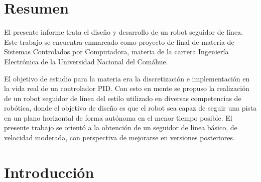 \documentclass[10pt,conference,a4paper,onecolumn]{article}%
\begin{document}
%
%
%

\section{Resumen}
El presente informe trata el diseño y desarrollo de un robot seguidor de línea. Este trabajo se encuentra enmarcado como proyecto de final de materia de Sistemas Controlados por Computadora, materia de la carrera Ingeniería Electrónica de la Universidad Nacional del Comáhue.

El objetivo de estudio para la materia era la discretización e implementación en la vida real de un controlador PID. Con esto en mente se propuso la realización de un robot seguidor de línea del estilo utilizado en diversas competencias de robótica, donde el objetivo de diseño es que el robot sea capaz de seguir una pista en un plano horizontal de forma autónoma en el menor tiempo posible. El presente trabajo se orientó a la obtención de un seguidor de línea básico, de velocidad moderada, con perspectiva de mejorarse en versiones posteriores.

\section{Introducción}
\end{document}
